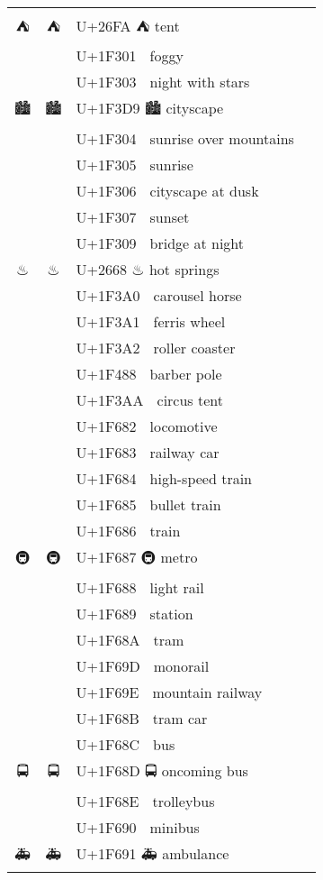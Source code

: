 \documentclass[a4paper,12pt]{ltjarticle}
\newcommand{\fontA}[1]{{\fontspec[RawFeature={mode=harf,+dist,+ccmp}]{Segoe UI Emoji} #1}}
\newcommand{\fontB}[1]{{\fontspec[RawFeature={mode=harf,+dist,+ccmp}]{Noto Color Emoji} #1}}
\begin{document}
\begin{longtable}[c]{ccp{0.8\linewidth}}
\fontA{⛺}&\fontB{⛺}&U+26FA ⛺ tent\\
\fontA{🌁}&\fontB{🌁}&U+1F301 🌁 foggy\\
\fontA{🌃}&\fontB{🌃}&U+1F303 🌃 night with stars\\
\fontA{🏙}&\fontB{🏙}&U+1F3D9 🏙 cityscape\\
\fontA{🌄}&\fontB{🌄}&U+1F304 🌄 sunrise over mountains\\
\fontA{🌅}&\fontB{🌅}&U+1F305 🌅 sunrise\\
\fontA{🌆}&\fontB{🌆}&U+1F306 🌆 cityscape at dusk\\
\fontA{🌇}&\fontB{🌇}&U+1F307 🌇 sunset\\
\fontA{🌉}&\fontB{🌉}&U+1F309 🌉 bridge at night\\
\fontA{♨}&\fontB{♨}&U+2668 ♨ hot springs\\
\fontA{🎠}&\fontB{🎠}&U+1F3A0 🎠 carousel horse\\
\fontA{🎡}&\fontB{🎡}&U+1F3A1 🎡 ferris wheel\\
\fontA{🎢}&\fontB{🎢}&U+1F3A2 🎢 roller coaster\\
\fontA{💈}&\fontB{💈}&U+1F488 💈 barber pole\\
\fontA{🎪}&\fontB{🎪}&U+1F3AA 🎪 circus tent\\
\fontA{🚂}&\fontB{🚂}&U+1F682 🚂 locomotive\\
\fontA{🚃}&\fontB{🚃}&U+1F683 🚃 railway car\\
\fontA{🚄}&\fontB{🚄}&U+1F684 🚄 high-speed train\\
\fontA{🚅}&\fontB{🚅}&U+1F685 🚅 bullet train\\
\fontA{🚆}&\fontB{🚆}&U+1F686 🚆 train\\
\fontA{🚇}&\fontB{🚇}&U+1F687 🚇 metro\\
\fontA{🚈}&\fontB{🚈}&U+1F688 🚈 light rail\\
\fontA{🚉}&\fontB{🚉}&U+1F689 🚉 station\\
\fontA{🚊}&\fontB{🚊}&U+1F68A 🚊 tram\\
\fontA{🚝}&\fontB{🚝}&U+1F69D 🚝 monorail\\
\fontA{🚞}&\fontB{🚞}&U+1F69E 🚞 mountain railway\\
\fontA{🚋}&\fontB{🚋}&U+1F68B 🚋 tram car\\
\fontA{🚌}&\fontB{🚌}&U+1F68C 🚌 bus\\
\fontA{🚍}&\fontB{🚍}&U+1F68D 🚍 oncoming bus\\
\fontA{🚎}&\fontB{🚎}&U+1F68E 🚎 trolleybus\\
\fontA{🚐}&\fontB{🚐}&U+1F690 🚐 minibus\\
\fontA{🚑}&\fontB{🚑}&U+1F691 🚑 ambulance\\

\end{longtable}
\end{document}
